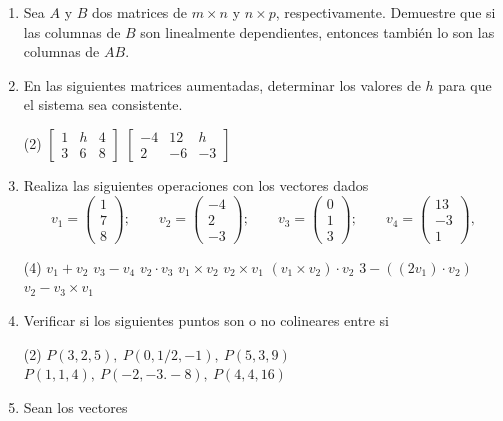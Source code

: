 \documentclass[12pt]{article}
\newenvironment{preguntas}
{\begin{enumerate}\itemsep12pt
	}
	{
	\end{enumerate}
}
\begin{document}
\begin{preguntas}
\item Sea $A$ y $B$ dos matrices de $m\times n$ y $n \times p$, respectivamente. Demuestre que si las columnas de $B$ son linealmente dependientes, entonces también lo son las columnas de $AB$.
\item En las siguientes matrices aumentadas, determinar los valores de $h$ para que el sistema sea consistente.
\begin{tasks}(2)
\task $
		\begin{bmatrix}
		1 & h & 4\\
		3 & 6 & 8
		\end{bmatrix}
		$
\task $
		\begin{bmatrix}
		-4 & 12 & h\\
		2 & -6 & -3
		\end{bmatrix}
		$
\end{tasks}
\item Realiza las siguientes operaciones con los vectores dados
	$$
	v_1 = \begin{pmatrix}
	1\\
	7\\
	8
\end{pmatrix};\qquad
	v_2 = \begin{pmatrix}
	-4\\
	2\\
	-3
\end{pmatrix}; \qquad
	v_3 = \begin{pmatrix}
	0\\
	1\\
	3
\end{pmatrix}; \qquad
	v_4 = \begin{pmatrix}
	13\\
	-3\\
	1
\end{pmatrix},
	 $$
\begin{tasks}(4)
\task $v_1 + v_2$
\task $v_3 - v_4$
\task $v_2 \cdot v_3$
\task $v_1 \times v_2$
\task $v_2 \times v_1$
\task $(v_1 \times v_2) \cdot v_2$
\task $3 - ((2v_1) \cdot v_2)$
\task $v_2 - v_3 \times v_1$
\end{tasks}
\item Verificar si los siguientes puntos son o no colineares entre si
\begin{tasks}(2)
\task $P(3,2,5), \ P(0, 1/2, -1), \ P(5, 3, 9)$
\task $P(1,1,4), \ P(-2,-3.-8), \ P(4,4,16)$
\end{tasks}
\item Sean los vectores

\end{preguntas}
\end{document}
